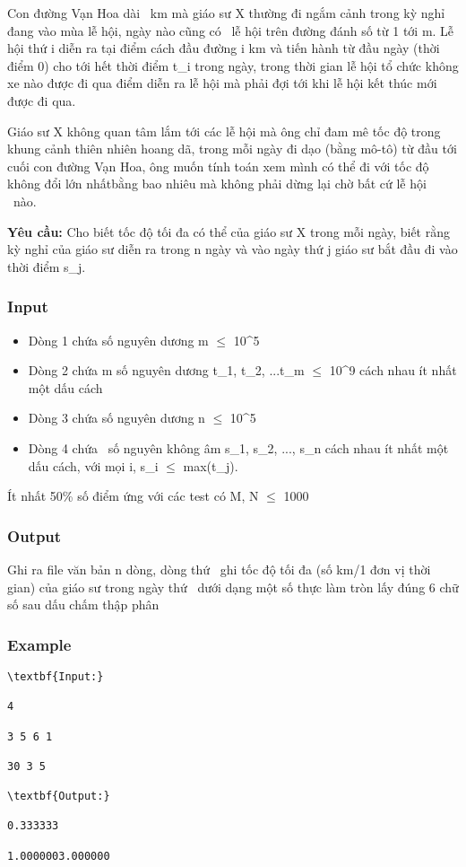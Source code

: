 



   Con đường Vạn Hoa dài                                                    km mà giáo sư X thường đi ngắm cảnh trong kỳ nghỉ đang vào mùa lễ hội, ngày nào cũng có     lễ hội trên đường đánh số từ 1 tới m. Lễ hội thứ i diễn ra tại điểm cách đầu đường i km và tiến hành từ đầu ngày (thời điểm 0) cho tới hết thời điểm t\_i trong ngày, trong thời gian lễ hội tổ chức không xe nào được đi qua điểm diễn ra lễ hội mà phải đợi tới khi lễ hội kết thúc mới được đi qua.  

   Giáo sư X không quan tâm lắm tới các lễ hội mà ông chỉ đam mê tốc độ trong khung cảnh thiên nhiên hoang dã, trong mỗi ngày đi dạo (bằng mô-tô) từ đầu tới cuối con đường Vạn Hoa, ông muốn tính toán xem mình có thể đi với tốc độ không đổi lớn nhấtbằng bao nhiêu mà không phải dừng lại chờ bất cứ lễ hội  nào.  

\textbf{    Yêu cầu:   }   Cho biết tốc độ tối đa có thể của giáo sư X trong mỗi ngày, biết rằng kỳ nghỉ của giáo sư diễn ra trong n ngày và vào ngày thứ j giáo sư bắt đầu đi vào thời điểm s\_j.  

\subsubsection{   Input  }
\begin{itemize}
	\item     Dòng 1 chứa số nguyên dương m  $\le$  10^5   
	\item     Dòng 2 chứa m số nguyên dương t\_1, t\_2, ...t\_m  $\le$  10^9 cách nhau ít nhất một dấu cách   
	\item     Dòng 3 chứa số nguyên dương n  $\le$  10^5   
	\item     Dòng 4 chứa     số nguyên không âm s\_1, s\_2, ..., s\_n cách nhau ít nhất một dấu cách, với mọi i, s\_i  $\le$  max(t\_j).   
\end{itemize}

Ít nhất 50\% số điểm ứng với các test có M, N  $\le$  1000

\subsubsection{   Output  }

   Ghi ra file văn bản n dòng, dòng thứ     ghi tốc độ tối đa (số km/1 đơn vị thời gian) của giáo sư trong ngày thứ     dưới dạng một số thực làm tròn lấy đúng 6 chữ số sau dấu chấm thập phân  

\subsubsection{   Example  }
\begin{verbatim}
\textbf{Input:}

4

3 5 6 1

30 3 5

\textbf{Output:}

0.333333

1.0000003.000000\end{verbatim}
